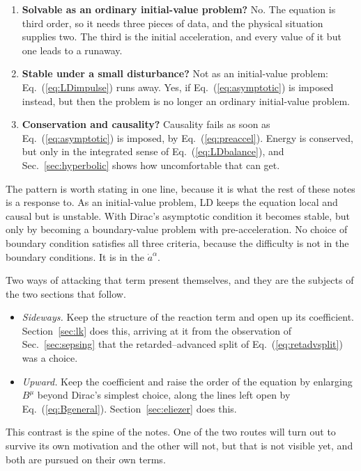 \documentclass[preprint]{aastex701}
\begin{document}
\begin{enumerate}

\item \textbf{Solvable as an ordinary initial-value problem?} No. The equation
is third order, so it needs three pieces of data, and the physical situation
supplies two. The third is the initial acceleration, and every value of it but
one leads to a runaway.

\item \textbf{Stable under a small disturbance?} Not as an initial-value
problem: Eq.~(\ref{eq:LDimpulse}) runs away. Yes, if
Eq.~(\ref{eq:asymptotic}) is imposed instead, but then the problem is no longer
an ordinary initial-value problem.

\item \textbf{Conservation and causality?} Causality fails as soon as
Eq.~(\ref{eq:asymptotic}) is imposed, by Eq.~(\ref{eq:preaccel}). Energy is
conserved, but only in the integrated sense of Eq.~(\ref{eq:LDbalance}), and
Sec.~\ref{sec:hyperbolic} shows how uncomfortable that can get.

\end{enumerate}

The pattern is worth stating in one line, because it is what the rest of these
notes is a response to. As an initial-value problem, LD keeps the equation local
and causal but is unstable. With Dirac's asymptotic condition it becomes stable,
but only by becoming a boundary-value problem with pre-acceleration. No choice
of boundary condition satisfies all three criteria, because the difficulty is
not in the boundary conditions. It is in the $\dot a^\alpha$.

Two ways of attacking that term present themselves, and they are the subjects
of the two sections that follow.

\begin{itemize}
\item \emph{Sideways.} Keep the structure of the reaction term and open up its
coefficient. Section~\ref{sec:lk} does this, arriving at it from the
observation of Sec.~\ref{sec:sepsing} that the retarded--advanced split of
Eq.~(\ref{eq:retadvsplit}) was a choice.
\item \emph{Upward.} Keep the coefficient and raise the order of the equation
by enlarging $B^\mu$ beyond Dirac's simplest choice, along the lines left open
by Eq.~(\ref{eq:Bgeneral}). Section~\ref{sec:eliezer} does this.
\end{itemize}

This contrast is the spine of the notes. One of the two routes will turn out to
survive its own motivation and the other will not, but that is not visible yet,
and both are pursued on their own terms.
\end{document}
